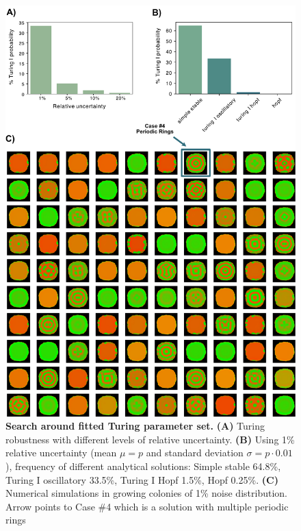 \begin{figure}[H] %
    \centering
    \begin{adjustbox}{center}
        \includegraphics[width=1\textwidth]{chapters/Chapter 3/turing_fit_noise_robustness} %
    \end{adjustbox}
    \caption{\textbf{Search around fitted Turing parameter set.} \textbf{(A)} Turing robustness with different levels of relative uncertainty. \textbf{(B)} Using 1\% relative uncertainty (mean $\mu=p$ and standard deviation $\sigma=p\cdot 0.01$), frequency of different analytical solutions: Simple stable 64.8\%, Turing I oscillatory 33.5\%, Turing I Hopf 1.5\%, Hopf 0.25\%. \textbf{(C)} Numerical simulations in growing colonies of 1\% noise distribution. Arrow points to Case \#4 which is a solution with multiple periodic rings}
    \label{fig:turing_fit_noise_robustness}
\end{figure}

